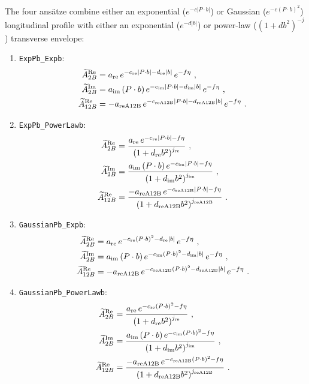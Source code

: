 The four ansätze combine either an exponential ($e^{-c|P\cdot b|}$) or Gaussian ($e^{-c(P\cdot b)^2}$) longitudinal profile with either an exponential ($e^{-d|b|}$) or power-law ($(1+db^2)^{-j}$) transverse envelope:
\begin{enumerate}
    \item \texttt{ExpPb\_Expb}:
    \begin{align}
        \tAmp_{2B}^{\text{Re}} &= a_{\text{re}} \, e^{-c_{\text{re}}|P\cdot b| - d_{\text{re}}|b|} \, e^{-f\eta} \ , \\
        \tAmp_{2B}^{\text{Im}} &= a_{\text{im}} \, (P\cdot b) \, e^{-c_{\text{im}}|P\cdot b| - d_{\text{im}}|b|} \, e^{-f\eta} \ , \\
        \tAmp_{12B}^{\text{Re}} &= -a_{\text{reA12B}} \, e^{-c_{\text{reA12B}}|P\cdot b| - d_{\text{reA12B}}|b|} \, e^{-f\eta} \ .
    \end{align}
    
    \item \texttt{ExpPb\_PowerLawb}:
    \begin{align}
        \widetilde{A}_{2B}^{\text{Re}} &= \frac{a_{\text{re}} \, e^{-c_{\text{re}}|P\cdot b| - f\eta}}{\left(1 + d_{\text{re}} b^2\right)^{j_{\text{re}}}} \ , \\
        \widetilde{A}_{2B}^{\text{Im}} &= \frac{a_{\text{im}} \, (P\cdot b) \, e^{-c_{\text{im}}|P\cdot b| - f\eta}}{\left(1 + d_{\text{im}} b^2\right)^{j_{\text{im}}}} \ , \\
        \widetilde{A}_{12B}^{\text{Re}} &= \frac{-a_{\text{reA12B}} \, e^{-c_{\text{reA12B}}|P\cdot b| - f\eta}}{\left(1 + d_{\text{reA12B}} b^2\right)^{j_{\text{reA12B}}}} \ .
    \end{align}

    \item \texttt{GaussianPb\_Expb}:
    \begin{align}
        \widetilde{A}_{2B}^{\text{Re}} &= a_{\text{re}} \, e^{-c_{\text{re}}(P\cdot b)^2 - d_{\text{re}}|b|} \, e^{-f\eta} \ , \\
        \widetilde{A}_{2B}^{\text{Im}} &= a_{\text{im}} \, (P\cdot b) \, e^{-c_{\text{im}}(P\cdot b)^2 - d_{\text{im}}|b|} \, e^{-f\eta} \ , \\
        \widetilde{A}_{12B}^{\text{Re}} &= -a_{\text{reA12B}} \, e^{-c_{\text{reA12B}}(P\cdot b)^2 - d_{\text{reA12B}}|b|} \, e^{-f\eta} \ .
    \end{align}

    \item \texttt{GaussianPb\_PowerLawb}:
    \begin{align}
        \widetilde{A}_{2B}^{\text{Re}} &= \frac{a_{\text{re}} \, e^{-c_{\text{re}}(P\cdot b)^2 - f\eta}}{\left(1 + d_{\text{re}} b^2\right)^{j_{\text{re}}}} \ , \\
        \widetilde{A}_{2B}^{\text{Im}} &= \frac{a_{\text{im}} \, (P\cdot b) \, e^{-c_{\text{im}}(P\cdot b)^2 - f\eta}}{\left(1 + d_{\text{im}} b^2\right)^{j_{\text{im}}}} \ , \\
        \widetilde{A}_{12B}^{\text{Re}} &= \frac{-a_{\text{reA12B}} \, e^{-c_{\text{reA12B}}(P\cdot b)^2 - f\eta}}{\left(1 + d_{\text{reA12B}} b^2\right)^{j_{\text{reA12B}}}} \ .
    \end{align}
\end{enumerate}

